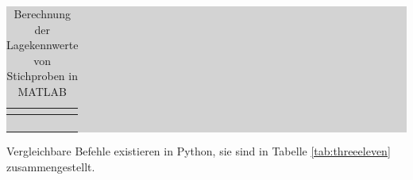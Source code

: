 \begin{table}[H]
\setlength{\arrayrulewidth}{.1em}
\caption{Berechnung der Lagekennwerte von Stichproben in MATLAB}
\setlength{\fboxsep}{0pt}%
\colorbox{lightgray}{%
%
\begin{tabular}{| c | c |}
\hline
\parbox[c][0.3in][c]{3.3in}{\smallskip\centering\textbf{\selectfont{Lagekennwert}}} & 
\parbox[c][0.3in][c]{3.3in}{\smallskip\centering\textbf{\selectfont{MATLAB-Befehl}}}\\ \hline

\parbox[c][0.3in][c]{3.3in}{\centering{}\selectfont{Mittelwert}} & 
\parbox[c][0.3in][c]{3.3in}{\centering{}\selectfont{mean(X)}}\\ \hline

\parbox[c][0.3in][c]{3.3in}{\centering{}\selectfont{Median}} & 
\parbox[c][0.3in][c]{3.3in}{\centering{}\selectfont{median(x)}}\\ \hline

\parbox[c][0.3in][c]{3.3in}{\centering{}\selectfont{Geometrisches Mittel }} & 
\parbox[c][0.3in][c]{3.3in}{\centering{}\selectfont{geomean(X)}}\\ \hline

\parbox[c][0.3in][c]{3.3in}{\centering{}\selectfont{Modus}} & 
\parbox[c][0.3in][c]{3.3in}{\centering{}\selectfont{mode(X)}}\\ \hline

\end{tabular}%
}
\label{tab:threeten}
\end{table}

\noindent Vergleichbare Befehle existieren in Python, sie sind in Tabelle \ref{tab:threeeleven} zusammengestellt.

